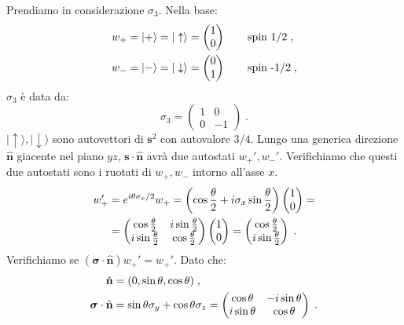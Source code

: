 \documentclass[12pt,a4paper]{report}
\theoremstyle{definition}
\numberwithin{equation}{section}
\newcommand{\ket}{\rangle}
\begin{document}
Prendiamo in considerazione $\sigma_3$. Nella base:
\begin{align}
w_+=|+\ket=|\uparrow\ket &=\left(\begin{matrix}
1 \\
0
\end{matrix}\right) \qquad \mbox{spin 1/2}\notag \;,\\
w_-=|-\ket=|\downarrow\ket &=\left(\begin{matrix}
0 \\
1
\end{matrix}\right)\qquad \mbox{spin -1/2}\;,
\end{align}
$\sigma_3$ è data da:
\begin{equation}
\sigma_3=\left(\begin{matrix}
1 & 0 \\
0 & -1
\end{matrix}\right)\;.
\end{equation}
$|\uparrow\ket,|\downarrow\ket$ sono autovettori di $\mathbf{s}^2$ con autovalore $3/4$. Lungo una generica direzione $\hat{\mathbf{n}}$ giacente nel piano $yz$, $\mathbf{s}\cdot\hat{\mathbf{n}}$ avrà due autostati $w_+',w_-'$. Verifichiamo che questi due autostati sono i ruotati di $w_+,w_-$ intorno all'asse $x$.
\begin{align}
w_+' &= e^{i\theta\sigma_x/2}w_+=\left(\cos\frac{\theta}{2}+i\sigma_x\sin\frac{\theta}{2}\right)\left(\begin{matrix}
1 \\
0
\end{matrix}\right) = \notag \\
&= \left(\begin{matrix}
\cos\frac{\theta}{2} & i\sin\frac{\theta}{2} \\
i\sin\frac{\theta}{2} & \cos\frac{\theta}{2}
\end{matrix}\right)\left(
\begin{matrix}
1 \\
0
\end{matrix}\right)=\left(
\begin{matrix}
\cos\frac{\theta}{2} \\
i\sin\frac{\theta}{2}
\end{matrix}\right)\;.
\end{align}
Verifichiamo se $(\boldsymbol{\sigma}\cdot\hat{\mathbf{n}})w_+'=w_+'$. Dato che:
\begin{align}
\hat{\mathbf{n}}&=(0,\sin\theta,\cos\theta)\;, \notag \\
\boldsymbol{\sigma}\cdot \hat{\mathbf{n}} &= \sin\theta \sigma_y+\cos\theta \sigma_z=
\left(\begin{matrix}
\cos\theta & -i\sin\theta \\
i\sin\theta & \cos\theta
\end{matrix}\right)\;.
\end{align}
\end{document}
